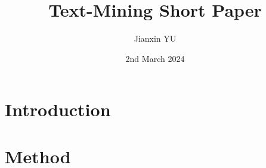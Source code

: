 \documentclass{article}
\title{Text-Mining Short Paper}
\author{Jianxin YU}
\date{2nd March 2024}
\begin{document}
\maketitle

\section{Introduction}

\section{Method}
\end{document}
